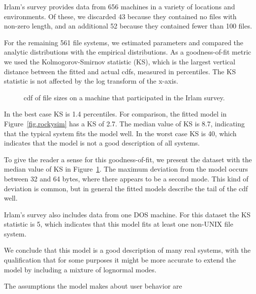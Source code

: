 \documentclass[10pt,twocolumn]{article}
\begin{document}
Irlam's survey
provides data from 656 machines in a variety of locations and 
environments.  Of these, we discarded 43 because they contained
no files with non-zero length, and an additional 52 because they
contained fewer than 100 files.

For the remaining 561 file systems, we estimated parameters and
compared the analytic distributions with the empirical
distributions.  As a goodness-of-fit metric we used the
Kolmogorov-Smirnov statistic (KS), which is the largest
vertical distance between the fitted and actual cdfs, measured
in percentiles.  The KS statistic is not affected by the log
transform of the x-axis.

\begin{figure}[tb]
\centerline{}
\caption{
cdf of file sizes
on a machine that participated in the Irlam survey.}
\label{fig.medianfit}
\end{figure}

In the best case KS is 1.4 percentiles.  For comparison, the fitted
model in Figure~\ref{fig.rockysim} has a KS of 2.7.  The median value
of KS is 8.7, indicating that the typical system fits the model well.
In the worst case KS is 40, which indicates that the model is not a
good description of all systems.


To give the reader a sense for this goodness-of-fit, we present the
dataset with the median value of KS in Figure~\ref{fig.medianfit}.
The maximum deviation from the model occurs between 32 and 64 bytes,
where there appears to be a second mode.  This kind of deviation is
common, but in general the fitted models describe the tail of the cdf
well.

Irlam's survey also includes data from one DOS machine.  For this
dataset the KS statistic is 5, which indicates that this model fits at
least one non-UNIX file system.

We conclude that this model is a good description of many real
systems, with the qualification that for some purposes it might
be more accurate to extend the model by including a mixture of
lognormal modes.


\label{realistic}

The assumptions the model makes about user behavior are
\end{document}
